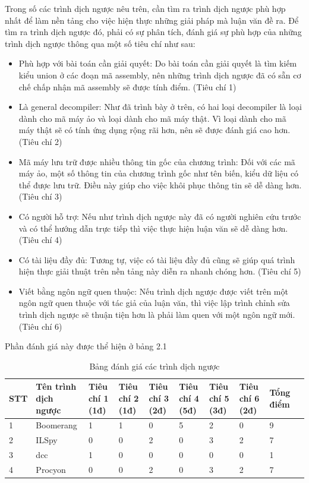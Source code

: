 Trong số các trình dịch ngược nêu trên, cần tìm ra trình dịch ngược phù hợp nhất để làm nền tảng cho việc hiện thực những giải pháp mà luận văn đề ra. Để tìm ra trình dịch ngược đó, phải có sự phân tích, đánh giá sự phù hợp của những trình dịch ngược thông qua một số tiêu chí như sau:
\begin{itemize}
	\item Phù hợp với bài toán cần giải quyết: Do bài toán cần giải quyết là tìm kiếm kiểu union ở các đoạn mã assembly, nên những trình dịch ngược đã có sẵn cơ chế chấp nhận mã assembly sẽ được tính điểm. (Tiêu chí 1)
	\item Là general decompiler: Như đã trình bày ở trên, có hai loại decompiler là loại dành cho mã máy ảo và loại dành cho mã máy thật. Vì loại dành cho mã máy thật sẽ có tính ứng dụng rộng rãi hơn, nên sẽ được đánh giá cao hơn. (Tiêu chí 2)
	\item Mã máy lưu trữ được nhiều thông tin gốc của chương trình: Đối với các mã máy ảo, một số thông tin của chương trình gốc như tên biến, kiểu dữ liệu có thể được lưu trữ. Điều này giúp cho việc khôi phục thông tin sẽ dễ dàng hơn. (Tiêu chí 3)
	\item Có người hỗ trợ: Nếu như trình dịch ngược này đã có người nghiên cứu trước và có thể hướng dẫn trực tiếp thì việc thực hiện luận văn sẽ dễ dàng hơn. (Tiêu chí 4)
	\item Có tài liệu đầy đủ: Tương tự, việc có tài liệu đầy đủ cũng sẽ giúp quá trình hiện thực giải thuật trên nền tảng này diễn ra nhanh chóng hơn. (Tiêu chí 5)
	\item Viết bằng ngôn ngữ quen thuộc: Nếu trình dịch ngược được viết trên một ngôn ngữ quen thuộc với tác giả của luận văn, thì việc lập trình chỉnh sửa trình dịch ngược sẽ thuận tiện hơn là phải làm quen với một ngôn ngữ mới. (Tiêu chí 6)
\end{itemize}
Phần đánh giá này được thể hiện ở bảng 2.1
\begin{table}[h!]
	\centering
	\begin{tabular}{ |p{0.7cm}| p{2cm}| p{1.5cm}| p{1.5cm}| p{2cm}| p{1.5cm}| p{1.5cm}
			| p{1.5cm}| p{1.5cm}| p{1.5cm}| }
	\hline
		
		STT & Tên trình dịch ngược & Tiêu chí 1 (1đ) & Tiêu chí 2 (1đ) & Tiêu chí 3 (2đ) & Tiêu chí 4 (5đ) & Tiêu chí 5 (3đ) & Tiêu chí 6 (2đ) & Tổng điểm\\
		\hline
		1 & Boomerang & 1 & 1 &0 & 5 & 2 & 0 & 9\\
	\hline
		2 & ILSpy & 0 & 0 & 2 & 0& 3 & 2 & 7\\
		\hline
		3 & dcc & 1 &0&0&0&0&0&1\\
		\hline
		4&Procyon&0&0&2&0&3&2&7\\
		\hline
	\end{tabular}


\label{table:abc}
	\caption{Bảng đánh giá các trình dịch ngược}
\end{table}


